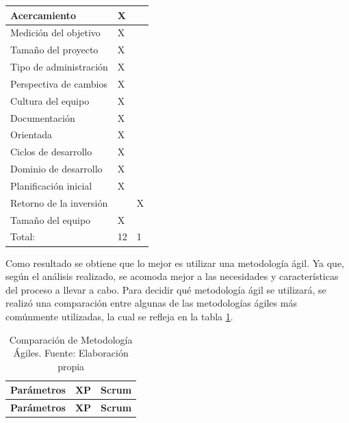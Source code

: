 {\begin{longtable}{|p{7cm}|p{2cm}|p{2cm}|}
    	Acercamiento & X & \\ 
    	\hline
    	\rowcolor[HTML]{EDEBF1}
    	Medición del objetivo & X & \\ 
    	\hline
    	Tamaño del proyecto & X & \\ 
    	\hline
    	\rowcolor[HTML]{EDEBF1}
    	Tipo de administración & X & \\ 
    	\hline
    	Perspectiva de cambios & X & \\ 
    	\hline
    	\rowcolor[HTML]{EDEBF1}
    	Cultura del equipo & X & \\ 
    	\hline
    	Documentación & X & \\ 
    	\hline
    	\rowcolor[HTML]{EDEBF1}
    	Orientada & X & \\ 
    	\hline
    	Ciclos de desarrollo & X & \\ 
    	\hline
    	\rowcolor[HTML]{EDEBF1}
    	Dominio de desarrollo & X & \\ 
    	\hline
    	Planificación inicial & X & \\ 
    	\hline
    	\rowcolor[HTML]{EDEBF1}
    	Retorno de la inversión &  & X \\ 
    	\hline
    	Tamaño del equipo & X & \\ 
    	\hline
    	\rowcolor[HTML]{EDEBF1}
    	Total: & 12 & 1 \\ 
    	\hline
    \end{longtable}
    
    Como resultado se obtiene que lo mejor es utilizar una metodología ágil. Ya que, según el análisis realizado, se acomoda mejor a las necesidades y características del proceso a llevar a cabo. Para decidir qué metodología ágil se utilizará, se realizó una comparación entre algunas de las metodologías ágiles más comúnmente utilizadas, la cual se refleja en la tabla \ref{tab:comparacionAgil}.
    
    
    \begin{longtable}{|p{4cm}|p{5.5cm}|p{5.5cm}|}
    	\caption{Comparación de Metodología Ágiles. Fuente: Elaboración propia}
    	\label{tab:comparacionAgil} \\
    	\hline
    	\rowcolor[HTML]{CBCEFB} 
    	\textbf{Parámetros} & \textbf{XP} & \textbf{Scrum} \\
    	\hline
    	\endfirsthead
    	
    	\hline
    	\rowcolor[HTML]{CBCEFB} 
    	\textbf{Parámetros} & \textbf{XP} & \textbf{Scrum} \\
    	\hline
    	\endhead
    	

\end{longtable}}
